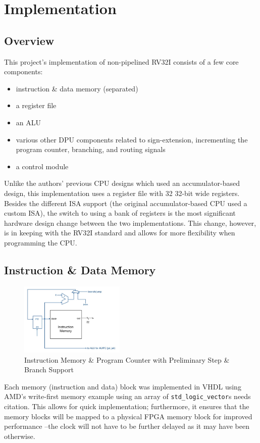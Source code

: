 \documentclass[lettersize,journal]{IEEEtran}
\begin{document}
\section{Implementation}
\subsection{Overview}
This project's implementation of non-pipelined RV32I consists of a few core components:
\begin{itemize}
    \item instruction \& data memory (separated)
    \item a register file
    \item an ALU
    \item various other DPU components related to sign-extension, incrementing the program counter, branching, and routing signals
    \item a control module
\end{itemize}
Unlike the authors' previous CPU designs which used an accumulator-based design, 
this implementation uses a register file with 32 32-bit wide registers.
Besides the different ISA support (the original accumulator-based CPU used a custom ISA),
the switch to using a bank of registers is the most significant hardware design change between the two implementations.
This change, however, is in keeping with the RV32I standard and allows for more flexibility when programming the CPU.

\subsection{Instruction \& Data Memory}
\begin{figure}[!h]
    \label{fig:instmemblock}
    \centering
    \includegraphics[width=5cm]{CPTR380_inst_mem.png}
    \caption{Instruction Memory \& Program Counter with Preliminary Step \& Branch Support}
\end{figure}
Each memory (instruction and data) block was implemented in VHDL using AMD's write-first memory example using an array of \verb|std_logic_vector|s \color{red}needs citation\color{black}.
This allows for quick implementation; furthermore, it ensures that the memory blocks will be mapped to a physical FPGA memory block for improved performance
--the clock will not have to be further delayed as it may have been otherwise.
\end{document}
